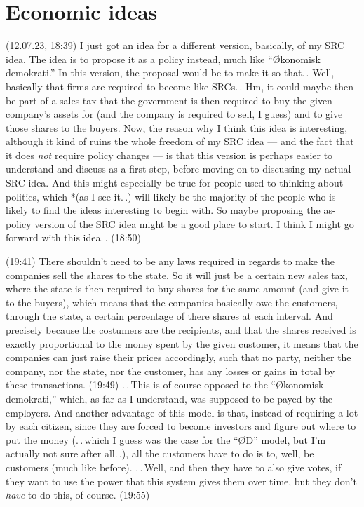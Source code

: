\documentclass{report}
\begin{document}














\chapter{Economic ideas}

(12.07.23, 18:39) I just got an idea for a different version, basically, of my SRC idea. The idea is to propose it as a policy instead, much like ``Økonomisk demokrati.'' In this version, the proposal would be to make it so that.\,. Well, basically that firms are required to become like SRCs.\,. Hm, it could maybe then be part of a sales tax that the government is then required to buy the given company's assets for (and the company is required to sell, I guess) and to give those shares to the buyers. Now, the reason why I think this idea is interesting, although it kind of ruins the whole freedom of my SRC idea --- and the fact that it does \emph{not} require policy changes --- is that this version is perhaps easier to understand and discuss as a first step, before moving on to discussing my actual SRC idea. And this might especially be true for people used to thinking about politics, which *(as I see it.\,.) will likely be the majority of the people who is likely to find the ideas interesting to begin with. So maybe proposing the as-policy version of the SRC idea might be a good place to start. I think I might go forward with this idea.\,. (18:50)

(19:41) There shouldn't need to be any laws required in regards to make the companies sell the shares to the state. So it will just be a certain new sales tax, where the state is then required to buy shares for the same amount (and give it to the buyers), which means that the companies basically owe the customers, through the state, a certain percentage of there shares at each interval. And precisely because the costumers are the recipients, and that the shares received is exactly proportional to the money spent by the given customer, it means that the companies can just raise their prices accordingly, such that no party, neither the company, nor the state, nor the customer, has any losses or gains in total by these transactions. (19:49) .\,.\,This is of course opposed to the ``Økonomisk demokrati,'' which, as far as I understand, was supposed to be payed by the employers. And another advantage of this model is that, instead of requiring a lot by each citizen, since they are forced to become investors and figure out where to put the money (.\,.\,which I guess was the case for the ``ØD'' model, but I'm actually not sure after all.\,.), all the customers have to do is to, well, be customers (much like before). .\,.\,Well, and then they have to also give votes, if they want to use the power that this system gives them over time, but they don't \emph{have} to do this, of course. (19:55)
\end{document}
